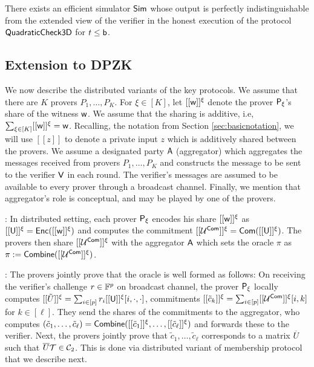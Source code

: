 \begin{lemma}\label{lem:simquadcheck}
There exists an efficient simulator $\mathsf{Sim}$ whose output is perfectly
indistinguishable from the extended view of the verifier in the honest execution
of the protocol $\mathsf{QuadraticCheck3D}$ for $t\leq \mathsf{b}$.
\end{lemma}


\subsection{Extension to DPZK}
We now describe the distributed variants of the key protocols. We assume that there 
are $K$ provers $P_1,\ldots,P_K$. For $\xi\in [K]$, let $[[{\mathsf{w}}]]^\xi$ denote the prover
$\mathsf{P}_\xi$'s share of the witness $\mathsf{w}$. We assume that the sharing is additive,
i.e, $\sum_{\xi\in [K]}[[{\mathsf{w}}]]^\xi=\mathsf{w}$. Recalling, the notation from Section
\ref{sec:basicnotation}, we will use $[[z]]$ to denote a private input $z$ which
is additively shared between the provers. We assume a designated party $\mathsf{A}$
(aggregator) which aggregates the messages received from
provers $P_1,\ldots,P_K$ and constructs the message to be sent to the verifier
$\mathsf{V}$ in each round. The verifier's  messages are assumed to be available to every
prover through a broadcast channel. Finally, we mention that aggregator's role
is conceptual, and may be played by one of the provers.

: In distributed setting, each prover
$\mathsf{P}_\xi$ encodes his share $[[{\mathsf{w}}]]^\xi$ as $[[{\mathsf{U}}]]^\xi=\mathsf{Enc}([[{\mathsf{w}}]]^\xi)$
and computes the commitment $[[{\mathcal{U}^{\mathsf{Com}}}]]^\xi=\mathsf{Com}([[{\mathsf{U}}]]^\xi)$. The provers
then share $[[{\mathcal{U}^{\mathsf{Com}}}]]^\xi$ with the aggregator $\mathsf{A}$ which sets the oracle
$\pi$ as $\pi := \mathsf{Combine}([[{\mathcal{U}^{\mathsf{Com}}}]]^\xi)$. 


: The provers jointly prove that the
oracle is well formed as follows: On receiving the verifier's challenge $r\in
\mathbb{F}^p$ on broadcast channel, the prover $\mathsf{P}_\xi$ locally computes
$[[{\tilde{U}}]]^\xi=\sum_{i\in [p]}r_i[[{\mathsf{U}}]]^\xi[i,\cdot,\cdot]$, commitments
$[[{\tilde{c}_k}]]^\xi=\sum_{i\in [p]}[[{\mathcal{U}^{\mathsf{Com}}}]]^\xi[i,k]$ for $k\in [\ell]$. They
send the shares of the commitments to the aggregator, who computes
$(\tilde{c}_1,\ldots,\tilde{c}_\ell)=\mathsf{Combine}([[{\tilde{c}_1}]]^\xi,\ldots,[[{\tilde{c}_\ell}]]^\xi)$
and forwards these to the verifier. Next, the provers jointly prove that
$\tilde{c}_1,\ldots,\tilde{c}_\ell$ corresponds to a matrix $\overline{U}$ such
that $\overline{U}\mathcal{T}\in \mathcal{C}_2$. This is done via distributed variant of
membership protocol that we describe next.

